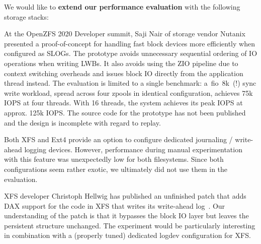 \documentclass[12pt,a4paper,twoside]{book}
\begin{document}
We would like to \textbf{extend our performance evaluation} with the following storage stacks:
\begin{description}[noitemsep,leftmargin=1.5cm,labelindent=1cm]
    \item[ZIL ZIO Bypass By Saji Nair]
    At the OpenZFS 2020 Developer summit, Saji Nair of storage vendor Nutanix presented a proof-of-concept for handling fast block devices more efficiently when configured as SLOGs.
    The prototype avoids unnecessary sequential ordering of IO operations when writing LWBs.
    It also avoids using the ZIO pipeline due to context switching overheads and issues block IO directly from the application thread instead.
    The evaluation is limited to a single benchmark: a~fio~8k~(!) sync write workload, spread across four zpools in identical configuration, achieves 75k IOPS at four threads.
    With 16 threads, the system achieves its peak IOPS at approx. 125k IOPS.
    The source code for the prototype has not been published and the design is incomplete with regard to replay.~\cite{openzfsZILPerformanceImprovements2020}

    \item[Ext4 journal\_dev / XFS logdev] Both XFS and Ext4 provide an option to configure dedicated journaling / write-ahead logging devices.
        However, performance during manual experimentation with this feature was unexpectedly low for both filesystems.
        Since both configurations seem rather exotic, we ultimately did not use them in the evaluation.

    \item[XFS DAX Log Patch] XFS developer Christoph Hellwig has published an unfinished patch that adds DAX support for the code in XFS that writes its write-ahead log~\cite{LKMLChristophHellwig}.
        Our understanding of the patch is that it bypasses the block IO layer but leaves the persistent structure unchanged.
        The experiment would be particularly interesting in combination with a (properly tuned) dedicated logdev configuration for XFS.
\end{description}
\end{document}
